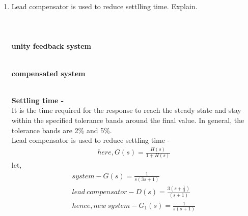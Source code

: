 \begin{enumerate}[label=\thesection.\arabic*.,ref=\thesection.\theenumi]
\item Lead compensator is used to reduce settlling time. Explain.\\
\\
\solution 
\\
\\
\textbf{unity feedback system}
\begin{figure}[h]
\begin{center}
\resizebox{\columnwidth}{!}{}
\end{center}
\end{figure}\\


 \textbf{compensated system}
\begin{figure}[h]
\begin{center}
\resizebox{\columnwidth}{!}{}
\end{center}
\end{figure}\\
\textbf{Settling time - }\\
It is the time required for the response to reach the steady state and stay within the specified tolerance bands around the final value. In general, the tolerance bands are 2\% and 5\%.
\\
Lead compensator is used to reduce settling time - \\
\begin{align}
here, G(s) =  \frac{H(s)}{1+H(s)}
\end{align}
let,\\
\begin{align}
system-G(s) = \frac{1}{s(3s+1)}\\
lead\ compensator-D(s) = \frac{3(s+\frac{1}{3})}{(s+1)} \\
hence, new\ system-G_{1}(s) = \frac{1}{s(s+1)}
\end{align}
\\


\end{enumerate}
